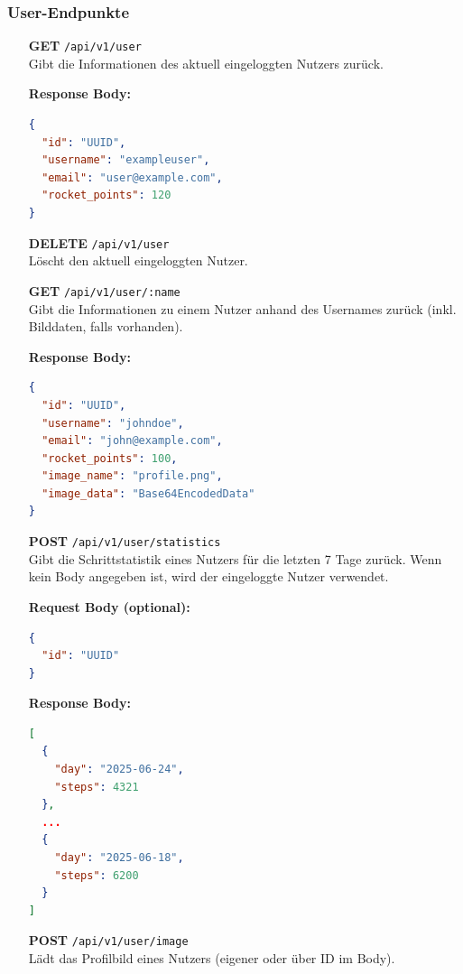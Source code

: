 \documentclass[11pt,a4paper]{article}
\begin{document}
\subsubsection{User-Endpunkte}

\begin{itemize}

\item[\textbf{GET}] \texttt{/api/v1/user} \\
Gibt die Informationen des aktuell eingeloggten Nutzers zurück.

\textbf{Response Body:}
\begin{lstlisting}[language=json]
{
  "id": "UUID",
  "username": "exampleuser",
  "email": "user@example.com",
  "rocket_points": 120
}
\end{lstlisting}

\item[\textbf{DELETE}] \texttt{/api/v1/user} \\
Löscht den aktuell eingeloggten Nutzer.

\item[\textbf{GET}] \texttt{/api/v1/user/:name} \\
Gibt die Informationen zu einem Nutzer anhand des Usernames zurück (inkl. Bilddaten, falls vorhanden).

\textbf{Response Body:}
\begin{lstlisting}[language=json]
{
  "id": "UUID",
  "username": "johndoe",
  "email": "john@example.com",
  "rocket_points": 100,
  "image_name": "profile.png",
  "image_data": "Base64EncodedData"
}
\end{lstlisting}

\item[\textbf{POST}] \texttt{/api/v1/user/statistics} \\
Gibt die Schrittstatistik eines Nutzers für die letzten 7 Tage zurück. Wenn kein Body angegeben ist, wird der eingeloggte Nutzer verwendet.

\textbf{Request Body (optional):}
\begin{lstlisting}[language=json]
{
  "id": "UUID"
}
\end{lstlisting}

\textbf{Response Body:}
\begin{lstlisting}[language=json]
[
  {
    "day": "2025-06-24",
    "steps": 4321
  },
  ...
  {
    "day": "2025-06-18",
    "steps": 6200
  }
]
\end{lstlisting}

\item[\textbf{POST}] \texttt{/api/v1/user/image} \\
Lädt das Profilbild eines Nutzers (eigener oder über ID im Body).


\end{itemize}
\end{document}
